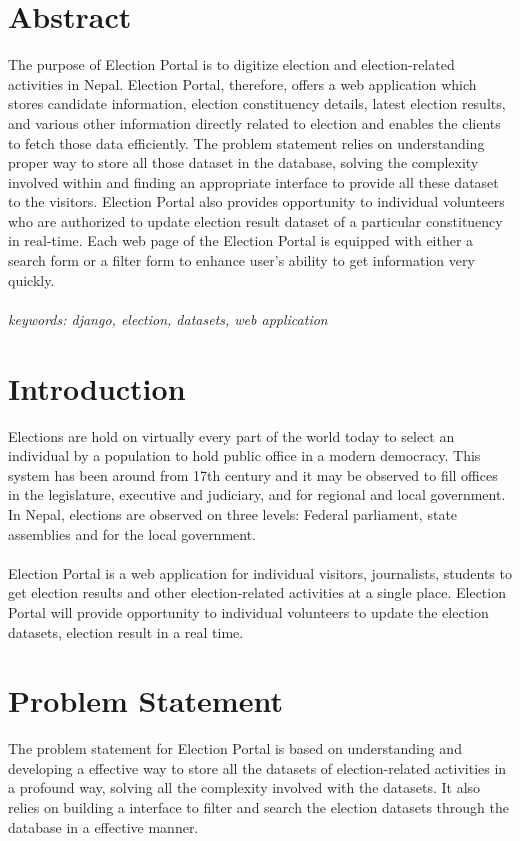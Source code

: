 \documentclass[12pt, a4paper, titlepage]{article}
\begin{document}
\section*{Abstract}
\thispagestyle{empty}
The purpose of Election Portal is to digitize election and election-related activities in Nepal. Election Portal, therefore, offers a web application which stores candidate information, election constituency details, latest election results, and various other information directly related to election and enables the clients to fetch those data efficiently. The problem statement relies on understanding proper way to store all those dataset in the database, solving the complexity involved within and finding an appropriate interface to provide all these dataset to the visitors. Election Portal also provides opportunity to individual volunteers who are authorized to update election result dataset of a particular constituency in real-time. Each web page of the Election Portal is equipped with either a search form or a filter form to enhance user's ability to get information very quickly. \\ \\
\textit{keywords: django,  election, datasets, web application}
\newpage

\tableofcontents
\thispagestyle{empty}
\newpage


\section{Introduction}
Elections are hold on virtually every part of the world today to select an individual by a population to hold public office in a modern democracy. This system has been around from 17th century and it may be observed to fill offices in the legislature, executive and judiciary, and for regional and local government. In Nepal, elections are observed on three levels: Federal parliament, state assemblies and for the local government. \\ \\
Election Portal is a web application for individual visitors, journalists, students to get election results and other election-related activities at a single place. Election Portal will provide opportunity to individual volunteers to update the election datasets, election result in a real time.

\section{Problem Statement}
The problem statement for Election Portal is based on understanding and developing a effective way to store all the datasets of election-related activities in a profound way, solving all the complexity involved with the datasets. It also relies on building a interface to filter and search the election datasets through the database in a effective manner.
\end{document}
